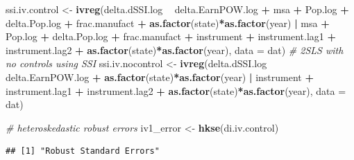 \documentclass[
]{article}
\newenvironment{Shaded}{\begin{snugshade}}{\end{snugshade}}
\newcommand{\CommentTok}[1]{\textcolor[rgb]{0.56,0.35,0.01}{\textit{#1}}}
\newcommand{\DataTypeTok}[1]{\textcolor[rgb]{0.13,0.29,0.53}{#1}}
\newcommand{\KeywordTok}[1]{\textcolor[rgb]{0.13,0.29,0.53}{\textbf{#1}}}
\newcommand{\NormalTok}[1]{#1}
\newcommand{\OperatorTok}[1]{\textcolor[rgb]{0.81,0.36,0.00}{\textbf{#1}}}
\newcommand{\StringTok}[1]{\textcolor[rgb]{0.31,0.60,0.02}{#1}}
\begin{document}
\begin{Shaded}
\begin{Highlighting}[]
\NormalTok{ssi.iv.control <-}\StringTok{ }\KeywordTok{ivreg}\NormalTok{(delta.dSSI.log }\OperatorTok{~}\StringTok{ }\NormalTok{delta.EarnPOW.log }\OperatorTok{+}\StringTok{ }\NormalTok{msa }\OperatorTok{+}\StringTok{ }\NormalTok{Pop.log }\OperatorTok{+}\StringTok{ }
\StringTok{                          }\NormalTok{delta.Pop.log }\OperatorTok{+}\StringTok{ }\NormalTok{frac.manufact }\OperatorTok{+}\StringTok{ }
\StringTok{                          }\KeywordTok{as.factor}\NormalTok{(state)}\OperatorTok{*}\KeywordTok{as.factor}\NormalTok{(year) }\OperatorTok{|}\StringTok{ }\NormalTok{msa }\OperatorTok{+}\StringTok{ }\NormalTok{Pop.log }\OperatorTok{+}\StringTok{ }
\StringTok{                          }\NormalTok{delta.Pop.log }\OperatorTok{+}\StringTok{ }\NormalTok{frac.manufact }\OperatorTok{+}\StringTok{ }\NormalTok{instrument }\OperatorTok{+}\StringTok{ }
\StringTok{                          }\NormalTok{instrument.lag1 }\OperatorTok{+}\StringTok{ }\NormalTok{instrument.lag2 }\OperatorTok{+}\StringTok{ }
\StringTok{                          }\KeywordTok{as.factor}\NormalTok{(state)}\OperatorTok{*}\KeywordTok{as.factor}\NormalTok{(year), }\DataTypeTok{data =}\NormalTok{ dat)}
\CommentTok{# 2SLS with no controls using SSI}
\NormalTok{ssi.iv.nocontrol <-}\StringTok{ }\KeywordTok{ivreg}\NormalTok{(delta.dSSI.log }\OperatorTok{~}\StringTok{ }\NormalTok{delta.EarnPOW.log }\OperatorTok{+}\StringTok{ }
\StringTok{                            }\KeywordTok{as.factor}\NormalTok{(state)}\OperatorTok{*}\KeywordTok{as.factor}\NormalTok{(year) }\OperatorTok{|}\StringTok{ }\NormalTok{instrument }\OperatorTok{+}\StringTok{ }
\StringTok{                            }\NormalTok{instrument.lag1 }\OperatorTok{+}\StringTok{ }\NormalTok{instrument.lag2 }\OperatorTok{+}\StringTok{ }
\StringTok{                            }\KeywordTok{as.factor}\NormalTok{(state)}\OperatorTok{*}\KeywordTok{as.factor}\NormalTok{(year), }\DataTypeTok{data =}\NormalTok{ dat)}
\end{Highlighting}
\end{Shaded}

\begin{Shaded}
\begin{Highlighting}[]
\CommentTok{# heteroskedastic robust errors}
\NormalTok{iv1_error <-}\StringTok{ }\KeywordTok{hkse}\NormalTok{(di.iv.control)}
\end{Highlighting}
\end{Shaded}

\begin{verbatim}
## [1] "Robust Standard Errors"
\end{verbatim}
\end{document}
